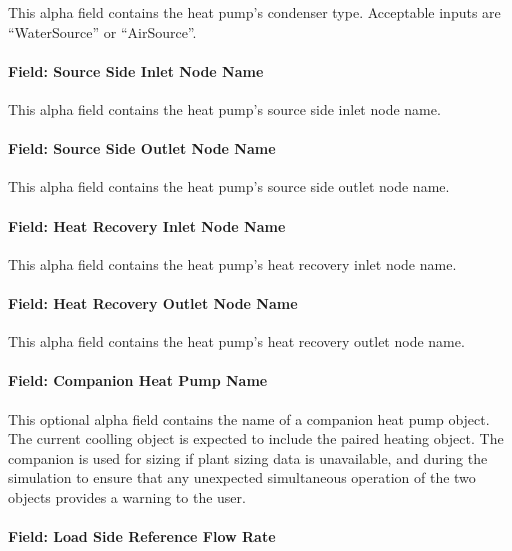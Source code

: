 This alpha field contains the heat pump's condenser type. Acceptable inputs are ``WaterSource'' or ``AirSource''.

\paragraph{Field: Source Side Inlet Node Name}\label{plhp_eir_cooling_inputs_source_inlet_node}

This alpha field contains the heat pump's source side inlet node name.

\paragraph{Field: Source Side Outlet Node Name}\label{plhp_eir_cooling_inputs_source_outlet_node}

This alpha field contains the heat pump's source side outlet node name.

\paragraph{Field: Heat Recovery Inlet Node Name}\label{plhp_eir_cooling_inputs_heat_recovery_inlet_node}

This alpha field contains the heat pump's heat recovery inlet node name.

\paragraph{Field: Heat Recovery Outlet Node Name}\label{plhp_eir_cooling_inputs_heat_recovery_outlet_node}

This alpha field contains the heat pump's heat recovery outlet node name.

\paragraph{Field: Companion Heat Pump Name}\label{plhp_eir_cooling_inputs_companion_name}

This optional alpha field contains the name of a companion heat pump object. The current coolling object is expected to include the paired heating object. The companion is used for sizing if plant sizing data is unavailable, and during the simulation to ensure that any unexpected simultaneous operation of the two objects provides a warning to the user.

\paragraph{Field: Load Side Reference Flow Rate}\label{plhp_eir_cooling_inputs_load_side_flow}

